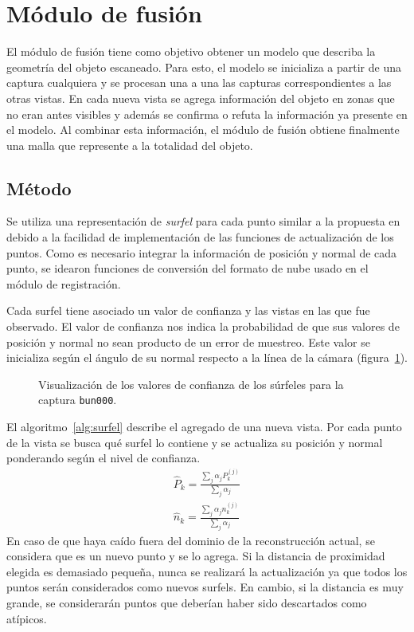 \section{Módulo de fusión}
	El módulo de fusión tiene como objetivo obtener un modelo que
	describa la geometría del objeto escaneado.
	Para esto, el modelo se inicializa a partir de una captura cualquiera
	y se procesan una a una las capturas correspondientes a las otras vistas.
	En cada nueva vista se agrega información del objeto en zonas que no eran antes visibles
	y además se confirma o refuta la información ya presente en el modelo.
	Al combinar esta información, el módulo de fusión obtiene finalmente una malla
	que represente a la totalidad del objeto.

	\subsection{Método}
	Se utiliza una representación de \emph{surfel} para cada punto similar a la propuesta en \cite{5457479} %
	debido a la facilidad de implementación de las funciones de actualización de los puntos.
	Como es necesario integrar la información de posición y normal de cada punto,
	se idearon funciones de conversión del formato de nube usado en el módulo de registración.

	Cada surfel tiene asociado un valor de confianza y las vistas en las que
	fue observado.  El valor de confianza nos indica la probabilidad de que sus
	valores de posición y normal no sean producto de un error de muestreo.
	Este valor se inicializa según el ángulo de su normal respecto a la línea
	de la cámara (figura~\ref{fig:confianza_surfel}).

	\begin{figure}
		\caption[Visualización de los valores de confianza de los súrfeles]{\label{fig:confianza_surfel}Visualización de los valores de confianza de los súrfeles para la captura \texttt{bun000}.}
	\end{figure}

	El algoritmo~\ref{alg:surfel} describe el agregado de una nueva vista.
	Por cada punto de la vista se busca qué surfel lo contiene y se actualiza
	su posición y normal ponderando según el nivel de confianza.
	\begin{eqnarray*}
		\hat{P}_k = \frac{\sum_{j} \alpha_j P^{(j)}_k}{\sum_{j} \alpha_j} \\
		\hat{n}_k = \frac{\sum_{j} \alpha_j n^{(j)}_k}{\sum_{j} \alpha_j}
	\end{eqnarray*}
	En caso de que haya caído fuera del dominio de la reconstrucción actual, se
	considera que es un nuevo punto y se lo agrega.
	Si la distancia de proximidad elegida es demasiado pequeña,
	nunca se realizará la actualización ya que todos los puntos serán considerados como nuevos surfels.
	En cambio, si la distancia es muy grande, se considerarán puntos
	que deberían haber sido descartados como atípicos.


